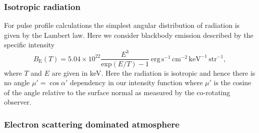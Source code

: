 \documentclass[iop, usenatbib]{emulateapj}
\begin{document}
\subsubsection{Isotropic radiation}

For pulse profile calculations the simplest angular distribution of
radiation is given by the Lambert law.  Here we consider blackbody
emission described by the specific intensity
\begin{equation}
  B_{\mathrm{E}}(T) = 5.04 \times 10^{22} \frac{E^3}{\mathrm{exp}(E/T) -1}~\mathrm{erg}\,\mathrm{s}^{-1}\,\mathrm{cm}^{-2}\,\mathrm{keV}^{-1}\,\mathrm{str}^{-1},
\end{equation}
where $T$ and $E$ are given in keV.
Here the radiation is isotropic and hence there is no angle $\mu' =
\cos\alpha'$ dependency in our intensity function where $\mu'$ is the cosine of the angle relative to the surface normal as measured by the co-rotating observer.

\subsubsection{Electron scattering dominated atmosphere}
\end{document}
